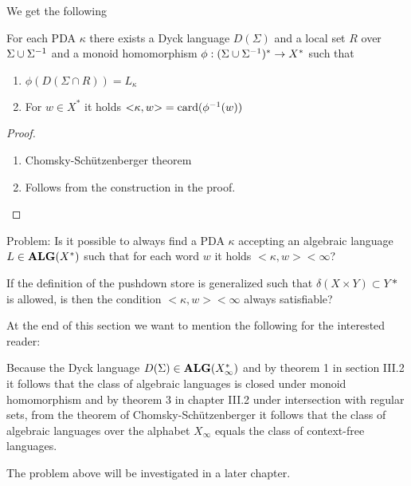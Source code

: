 We get the following
\begin{corollary}
For each PDA $\kappa$ there exists a Dyck language $D(\Sigma)$ and a local set
$R$ over $\Sigma \cup {\Sigma}^{-1}$ and a monoid homomorphism $\phi:
(\Sigma \cup {\Sigma}^{-1})^* \to X^*$ such that
\begin{enumerate}
  \item $\phi(D(\Sigma\cap R)) = L_\kappa$
  \item For $w\in X^*$ it holds ${<}\kappa, w{>} = \mathrm{card}({\phi^{-1}(w)})$
\end{enumerate}
\end{corollary}

\begin{proof}\ 

\begin{enumerate}
  \item Chomsky-Schützenberger theorem
  \item Follows from the construction in the proof.
\end{enumerate}
\end{proof}

Problem: Is it possible to always find a PDA $\kappa$ accepting an algebraic
language $L \in \mbox{{\bf ALG}}(X^*)$ such that for each word $w$ it holds 
${<}\kappa, w{>} < \infty$?

If the definition of the pushdown store is generalized such that $\delta(X
\times Y) \subset Y*$ is allowed, is then the condition ${<}\kappa, w{>} <
\infty$ always satisfiable?

At the end of this section we want to mention the following for the interested
reader:

Because the Dyck language $D(\Sigma) \in \mbox{{\bf ALG}}(X_\infty^*)$ and by theorem 1
in section III.2 it follows that the class of algebraic languages is closed
under monoid homomorphism and by theorem 3 in chapter III.2 under intersection 
with regular sets, from the theorem of Chomsky-Schützenberger it follows that
the class of algebraic languages over the alphabet $X_\infty$ equals the class 
of context-free languages.

The problem above will be investigated in a later chapter.
